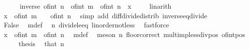 \begin{isabellebody}
\ \ \ \ \isamarkupfalse%
\ {\isachardoublequoteopen}inverse\ {\isacharparenleft}{\kern0pt}of{\isacharunderscore}{\kern0pt}int\ n{\isacharparenright}{\kern0pt}\ {\isacharless}{\kern0pt}\ of{\isacharunderscore}{\kern0pt}int\ m\ {\isacharslash}{\kern0pt}\ of{\isacharunderscore}{\kern0pt}int\ n\ {\isacharminus}{\kern0pt}\ x{\isachardoublequoteclose}\ \isamarkupfalse%
\ {\isacharasterisk}{\kern0pt}\ \isamarkupfalse%
\ linarith\isanewline
\ \ \ \ \isamarkupfalse%
\ {\isachardoublequoteopen}x\ {\isacharless}{\kern0pt}\ {\isacharparenleft}{\kern0pt}of{\isacharunderscore}{\kern0pt}int\ m\ {\isacharminus}{\kern0pt}\ {}{\isacharparenright}{\kern0pt}\ {\isacharslash}{\kern0pt}\ of{\isacharunderscore}{\kern0pt}int\ n{\isachardoublequoteclose}\ \isamarkupfalse%
\ {\isacharparenleft}{\kern0pt}simp\ add{\isacharcolon}{\kern0pt}\ diff{\isacharunderscore}{\kern0pt}divide{\isacharunderscore}{\kern0pt}distrib\ inverse{\isacharunderscore}{\kern0pt}eq{\isacharunderscore}{\kern0pt}divide{\isacharparenright}{\kern0pt}\isanewline
\ \ \ \ \isamarkupfalse%
\ False\ \isamarkupfalse%
\ m{\isacharunderscore}{\kern0pt}def\ \isamarkupfalse%
\ n{\isacharparenleft}{\kern0pt}{}{\isacharparenright}{\kern0pt}\ divide{\isacharunderscore}{\kern0pt}le{\isacharunderscore}{\kern0pt}eq\ linorder{\isacharunderscore}{\kern0pt}not{\isacharunderscore}{\kern0pt}less\ \isamarkupfalse%
\ fastforce\isanewline
\ \ \isacommand{{\isacharbraceright}{\kern0pt}}\isamarkupfalse%
\isanewline
\ \ \isamarkupfalse%
\ \isamarkupfalse%
\ {\isachardoublequoteopen}x\ {\isacharless}{\kern0pt}\ of{\isacharunderscore}{\kern0pt}int\ m\ {\isacharslash}{\kern0pt}\ of{\isacharunderscore}{\kern0pt}int\ n{\isachardoublequoteclose}\ \isamarkupfalse%
\ m{\isacharunderscore}{\kern0pt}def\ \isamarkupfalse%
\ {\isacharparenleft}{\kern0pt}meson\ n{\isacharparenleft}{\kern0pt}{}{\isacharparenright}{\kern0pt}\ floor{\isacharunderscore}{\kern0pt}correct\ mult{\isacharunderscore}{\kern0pt}imp{\isacharunderscore}{\kern0pt}less{\isacharunderscore}{\kern0pt}div{\isacharunderscore}{\kern0pt}pos\ of{\isacharunderscore}{\kern0pt}int{\isacharunderscore}{\kern0pt}pos{\isacharparenright}{\kern0pt}\isanewline
\ \ \isamarkupfalse%
\ \isamarkupfalse%
\ {\isacharquery}{\kern0pt}thesis\ \isamarkupfalse%
\ that\ n\ \isamarkupfalse%

\end{isabellebody}
